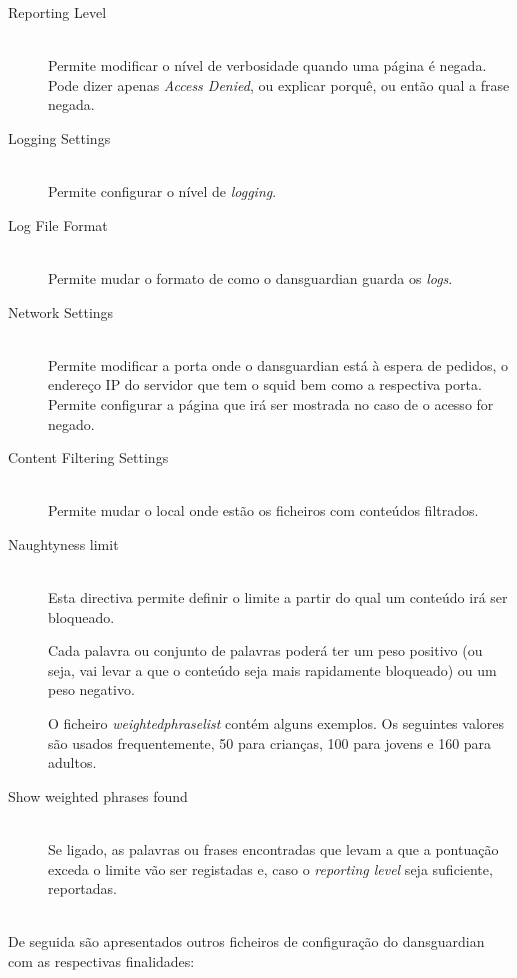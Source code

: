 \begin{description}
\item[Reporting Level]~\\
Permite modificar o nível de verbosidade quando uma página é negada.
Pode dizer apenas \emph{Access Denied}, ou explicar porquê, ou então
qual a frase negada.

\item[Logging Settings]~\\
Permite configurar o nível de \emph{logging}.

\item[Log File Format]~\\
Permite mudar o formato de como o dansguardian guarda os \emph{logs}.

\item[Network Settings]~\\
Permite modificar a porta onde o dansguardian está à espera de pedidos,
o endereço IP do servidor que tem o squid bem como a respectiva porta. 
Permite configurar a página que irá ser mostrada no caso de o acesso
for negado.

\item[Content Filtering Settings]~\\
Permite mudar o local onde estão os ficheiros com conteúdos filtrados.

\item[Naughtyness limit]~\\
Esta directiva permite definir o limite a partir do qual um conteúdo
irá ser bloqueado.

Cada palavra ou conjunto de palavras poderá ter um peso positivo
(ou seja, vai levar a que o conteúdo seja mais rapidamente bloqueado)
ou um peso negativo.

O ficheiro \emph{weightedphraselist} contém alguns exemplos.
Os seguintes valores são usados frequentemente, 50 para crianças, 100
para jovens e 160 para adultos.

\item[Show weighted phrases found]~\\
Se ligado, as palavras ou frases encontradas que levam a que a
pontuação exceda o limite vão ser registadas e, caso o
\emph{reporting level} seja suficiente, reportadas.
\end{description}

~\\

De seguida são apresentados outros ficheiros de configuração do
dansguardian com as respectivas finalidades:

